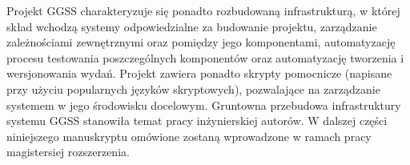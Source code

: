 Projekt GGSS charakteryzuje się ponadto rozbudowaną infrastrukturą, w której skład wchodzą systemy odpowiedzialne za budowanie projektu, zarządzanie zależnościami zewnętrznymi oraz pomiędzy jego komponentami, automatyzację procesu testowania poszczególnych komponentów oraz automatyzację tworzenia i wersjonowania wydań. Projekt zawiera ponadto skrypty pomocnicze (napisane przy użyciu popularnych języków skryptowych), pozwalające na zarządzanie systemem w jego środowisku docelowym. Gruntowna przebudowa infrastruktury systemu GGSS stanowiła temat pracy inżynierskiej autorów. W dalszej części niniejszego manuskryptu omówione zostaną wprowadzone w ramach pracy magistersiej rozszerzenia.




